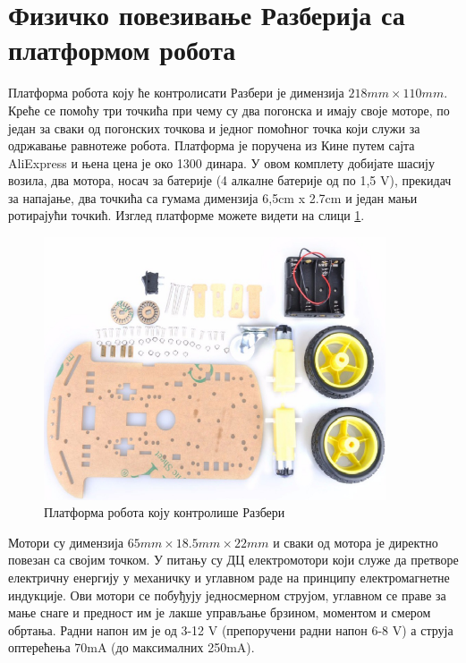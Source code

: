 \documentclass[12pt,oneside]{memoir}
\theoremstyle{remark}
\begin{document}
\section{Физичко повезивање Разберија са платформом робота}
Платформа робота коју ће контролисати Разбери је димензија $218mm \times 110mm$. Креће се помоћу три точкића при чему су два погонска и имају своје моторе, по један за сваки од погонских точкова и једног помоћног точка који служи за одржавање равнотеже робота. Платформа је поручена из Кине путем сајта AliExpress и њена цена је око 1300 динара. У овом комплету добијате шасију возила, два мотора, носач за батерије (4 алкалне батерије од по 1,5 V), прекидач за напајање, два точкића са гумама димензија 6,5cm x 2.7cm и један мањи ротирајући точкић. Изглед платформе можете видети на слици \ref{fig:platformarobota}. 

\begin{figure}[!ht]
\centering
\includegraphics[width=0.9\textwidth]{slike/platforma.png}
\caption{Платформа робота коју контролише Разбери}
\label{fig:platformarobota}
\end{figure}

Мотори су димензија $65mm \times 18.5mm \times 22mm$ и сваки од мотора је директно повезан са својим точком. У питању су ДЦ електромотори који служе да претворе електричну енергију у механичку и углавном раде на принципу електромагнетне индукције. Ови мотори се побуђују једносмерном струјом, углавном се праве за мање снаге и предност им је лакше управљање брзином, моментом и смером обртања. Радни напон им је од 3-12 V (препоручени радни напон 6-8 V) а струја оптерећења 70mA (до максималних 250mA).
\end{document}
